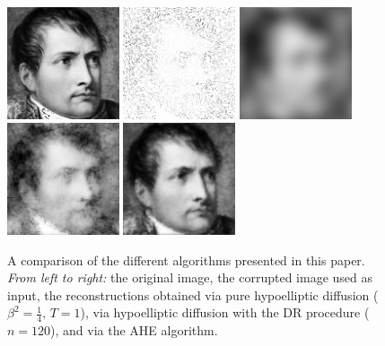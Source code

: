 \documentclass[proc]{edpsmath}
\begin{document}
\begin{figure}
  \includegraphics[height = 3.3cm]{imgs/napo-orig}
  \includegraphics[height = 3.3cm]{imgs/napo-corr}
  \includegraphics[height = 3.3cm]{imgs/napo-PH}
  \includegraphics[height = 3.3cm]{imgs/napo-DR}
  \includegraphics[height = 3.3cm]{imgs/napo-AHE}
  \caption{A comparison of the different algorithms presented in this paper. \emph{From left to right:} the original image, the corrupted image used as input, the reconstructions obtained via pure hypoelliptic diffusion ($\beta^2=\frac14,\, T=1$),
  {via  hypoelliptic diffusion with the DR procedure ($n=120$)}, and via the AHE algorithm.}
  \label{fig:comparison}
\end{figure}
\end{document}
